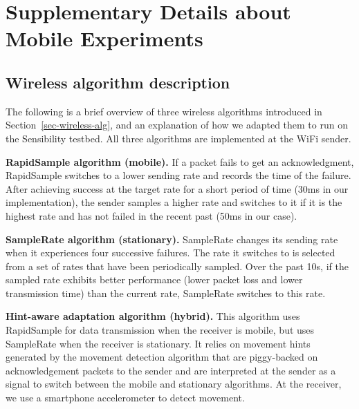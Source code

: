 \section{Supplementary Details about Mobile Experiments}

\subsection{Wireless algorithm description}\label{appdx-alg}

The following is a brief overview of three wireless algorithms 
introduced in Section~\ref{sec-wireless-alg}, and an 
explanation of how we adapted them to run on the Sensibility 
testbed. All three algorithms are implemented at the WiFi sender. 

\textbf{RapidSample algorithm (mobile).} If a packet fails to get an
acknowledgment, RapidSample switches to a lower sending rate and
records the time of the failure. After achieving success at the target rate for a short
period of time (30ms in our implementation), the sender samples a
higher rate and switches to it if it is the highest rate and has not
failed in the recent past (50ms in our case).

\textbf{SampleRate algorithm (stationary).} SampleRate changes its
sending rate when it experiences four successive failures. The rate it
switches to is selected from a set of rates that have been
periodically sampled. Over the past 10s, if the sampled rate
exhibits better performance (lower packet loss and lower transmission time)
than the current rate, SampleRate switches to this rate.

\textbf{Hint-aware adaptation algorithm (hybrid).} This algorithm
uses RapidSample for data
transmission when the receiver is mobile, but uses SampleRate
when the receiver is stationary. It relies on movement hints generated by the
movement detection algorithm that are piggy-backed on acknowledgement packets
to the sender and are interpreted at the sender
as a signal to switch between the mobile and stationary algorithms. At 
the receiver, we use a smartphone accelerometer to detect 
movement.